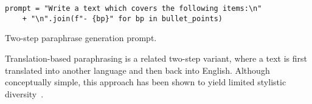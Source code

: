 \begin{listing}[ht]
\begin{verbatim}
prompt = "Write a text which covers the following items:\n" 
    + "\n".join(f"- {bp}" for bp in bullet_points)
\end{verbatim}
\caption{Two-step paraphrase generation prompt.}
\label{lst:two_step_bullet_point_prompt}
\end{listing}

Translation-based paraphrasing is a related two-step variant, where a text is first translated into another language and then back into English. 
Although conceptually simple, this approach has been shown to yield limited stylistic diversity~\citep{zhou_paraphrase_2025}.